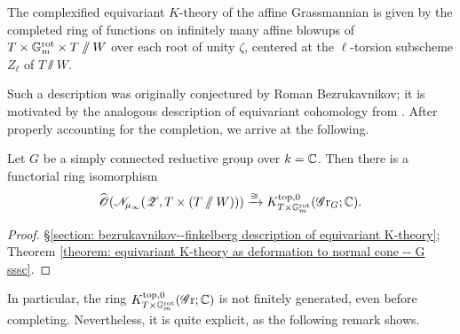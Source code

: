 \begin{motto}
The complexified equivariant $K$-theory of the affine Grassmannian is given by the completed ring of functions on infinitely many affine blowups of $T \times \mathbb{G}_m^{\mathrm{rot}} \times T\sslash W$ over each root of unity $\zeta$, centered at the $\ell$-torsion subscheme $Z_{\ell}$ of $T \sslash W$.    
\end{motto}



Such a description was originally conjectured by Roman Bezrukavnikov; it is motivated by the analogous description of equivariant cohomology from \cite[Theorem 1]{BF07}. After properly accounting for the completion, we arrive at the following. 
\begin{theorem}\label{introtheorem: bezrukavnikov description of equivariant K-theory: sc}
Let $G$ be a simply connected reductive group over $k=\operatorname{\mathbb{C}}$. Then there is a functorial ring isomorphism
\begin{equation*}
   \widehat{\operatorname{\mathscr{O}}}({\mathscr{N}}_{\mu_{\infty}}(\operatorname{\mathscr{Z}}, T \times (T \sslash W))) \xrightarrow{\cong} K^{\mathrm{top}, 0}_{T \times \mathbb{G}_m^{\mathrm{rot}}}(\operatorname{\mathscr{G}r}_G; \operatorname{\mathbb{C}}).
\end{equation*}
\end{theorem}
\begin{proof}
\S \ref{section: bezrukavnikov--finkelberg description of equivariant K-theory}; Theorem \ref{theorem: equivariant K-theory as deformation to normal cone -- G sssc}.    
\end{proof}

In particular, the ring $K^{\mathrm{top}, 0}_{T \times \mathbb{G}_m^{\mathrm{rot}}}(\operatorname{\mathscr{G}r}; \operatorname{\mathbb{C}})$ is not finitely generated, even before completing. Nevertheless, it is quite explicit, as the following remark shows.


